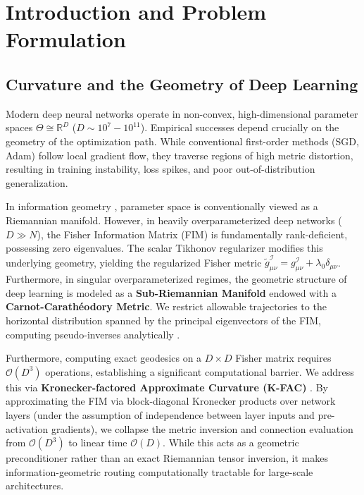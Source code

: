 \documentclass[11pt,reqno]{amsart}
\theoremstyle{definition}
\providecommand{\R}{\mathbb{R}}
\newcommand{\Fisher}{\mathcal{I}}
\numberwithin{equation}{section}
\providecommand{\R}{\mathbb{R}}
\begin{document}
\maketitle

\tableofcontents
\newpage

\section{Introduction and Problem Formulation}

\subsection{Curvature and the Geometry of Deep Learning}
Modern deep neural networks operate in non-convex, high-dimensional parameter spaces $\Theta \cong \R^D$ ($D \sim 10^7 - 10^{11}$). Empirical successes depend crucially on the geometry of the optimization path. While conventional first-order methods (SGD, Adam) follow local gradient flow, they traverse regions of high metric distortion, resulting in training instability, loss spikes, and poor out-of-distribution generalization.

In information geometry \cite{amari2000}, parameter space is conventionally viewed as a Riemannian manifold. However, in heavily overparameterized deep networks ($D \gg N$), the Fisher Information Matrix (FIM) is fundamentally rank-deficient, possessing zero eigenvalues. The scalar Tikhonov regularizer modifies this underlying geometry, yielding the regularized Fisher metric $\tilde{g}^{\Fisher}_{\mu\nu} = g^{\Fisher}_{\mu\nu} + \lambda_0 \delta_{\mu\nu}$. Furthermore, in singular overparameterized regimes, the geometric structure of deep learning is modeled as a \textbf{Sub-Riemannian Manifold} endowed with a \textbf{Carnot-Carath\'eodory Metric}. We restrict allowable trajectories to the horizontal distribution spanned by the principal eigenvectors of the FIM, computing pseudo-inverses analytically \cite{amari1998}.

Furthermore, computing exact geodesics on a $D \times D$ Fisher matrix requires $\mathcal{O}(D^3)$ operations, establishing a significant computational barrier. We address this via \textbf{Kronecker-factored Approximate Curvature (K-FAC)} \cite{martens2015}. By approximating the FIM via block-diagonal Kronecker products over network layers (under the assumption of independence between layer inputs and pre-activation gradients), we collapse the metric inversion and connection evaluation from $\mathcal{O}(D^3)$ to linear time $\mathcal{O}(D)$. While this acts as a geometric preconditioner rather than an exact Riemannian tensor inversion, it makes information-geometric routing computationally tractable for large-scale architectures.
\end{document}
